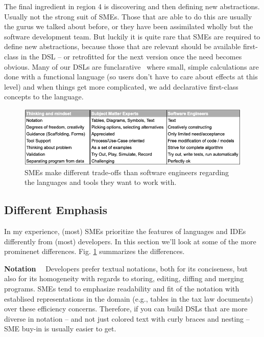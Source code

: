 \documentclass[runningheads]{llncs}
\newcommand\parhead[1]{\vspace{1mm}\noindent\textbf{{#1}}\ \ }
\newcommand{\fig}[1]{Fig. \ref{#1}}  %
\begin{document}
The final ingredient in region 4 is discovering and then defining new
abstractions. Usually not the strong suit of SMEs. Those that are able to
do this are usually the gurus we talked about before, or they have been
assimilated wholly but the software development team. But luckily it is
quite rare that SMEs are required to define new abstractions, because those
that are relevant should be available first-class in the DSL -- or retrofitted
for the next version once the need becomes obvious. Many of our DSLs are
funclarative~\cite{voelter2018fusing} where small, simple calculations are done with a functional
language (so users don't have to care about effects at this level) and 
when things get more complicated, we add declarative first-class concepts
to the language.
 
\begin{figure}
\begin{center}
    \includegraphics[width=1\columnwidth]{figures/table-prefs.png}
    \caption{SMEs make different trade-offs than software engineers 
    regarding the languages and tools they want to work with.}
    \label{table-prefs}
\end{center} 
\end{figure} 

\subsection{Different Emphasis}

In my experience, (most) SMEs prioritize the features of languages and IDEs differently
from (most) developers. In this section we'll look at some of the more prominenet differences.
\fig{table-prefs} summarizes the differences.

\parhead{Notation} Developers prefer textual notations, both for its
conciseness, but also for its homogeneity with regards to storing, editing,
diffing and merging programs. SMEs tend to emphasize readability and fit of
the notation with establised representations in the domain (e.g., tables in
the tax law documents) over these efficiency concerns. Therefore, if you can
build DSLs that are more diverse in notation -- and not just colored text with
curly braces and nesting -- SME buy-in is usually easier to get.
\end{document}
